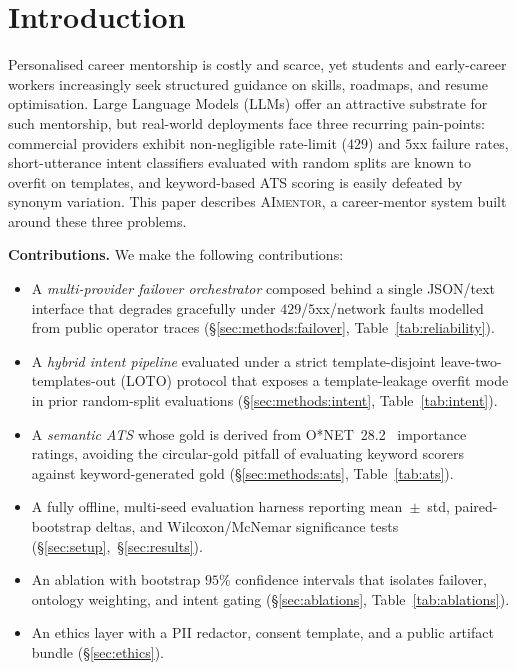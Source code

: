 \documentclass[conference]{IEEEtran}
\begin{document}
\section{Introduction}\label{sec:intro}

Personalised career mentorship is costly and scarce, yet students and
early-career workers increasingly seek structured guidance on skills,
roadmaps, and resume optimisation. Large Language Models (LLMs) offer an
attractive substrate for such mentorship, but real-world deployments face
three recurring pain-points: commercial providers exhibit
non-negligible rate-limit ($429$) and $5$xx failure rates, short-utterance
intent classifiers evaluated with random splits are known to overfit on
templates, and keyword-based ATS scoring is easily defeated by synonym
variation. This paper describes \textsc{AImentor}, a career-mentor system
built around these three problems.

\noindent\textbf{Contributions.} We make the following contributions:
\begin{itemize}
  \item A \emph{multi-provider failover orchestrator} composed behind a
        single JSON/text interface that degrades gracefully under
        $429$/$5$xx/network faults modelled from public operator
        traces (\S\ref{sec:methods:failover},
        Table~\ref{tab:reliability}).
  \item A \emph{hybrid intent pipeline} evaluated under a strict
        template-disjoint leave-two-templates-out (LOTO) protocol that
        exposes a template-leakage overfit mode in prior random-split
        evaluations (\S\ref{sec:methods:intent},
        Table~\ref{tab:intent}).
  \item A \emph{semantic ATS} whose gold is derived from
        O*NET~28.2~\cite{onet282} importance ratings, avoiding the
        circular-gold pitfall of evaluating keyword scorers against
        keyword-generated gold (\S\ref{sec:methods:ats},
        Table~\ref{tab:ats}).
  \item A fully offline, multi-seed evaluation harness reporting
        mean~$\pm$~std, paired-bootstrap deltas, and Wilcoxon/McNemar
        significance tests
        (\S\ref{sec:setup},~\S\ref{sec:results}).
  \item An ablation with bootstrap $95\%$ confidence intervals that
        isolates failover, ontology weighting, and intent gating
        (\S\ref{sec:ablations},
        Table~\ref{tab:ablations}).
  \item An ethics layer with a PII redactor, consent template, and
        a public artifact bundle
        (\S\ref{sec:ethics}).
\end{itemize}
\end{document}
